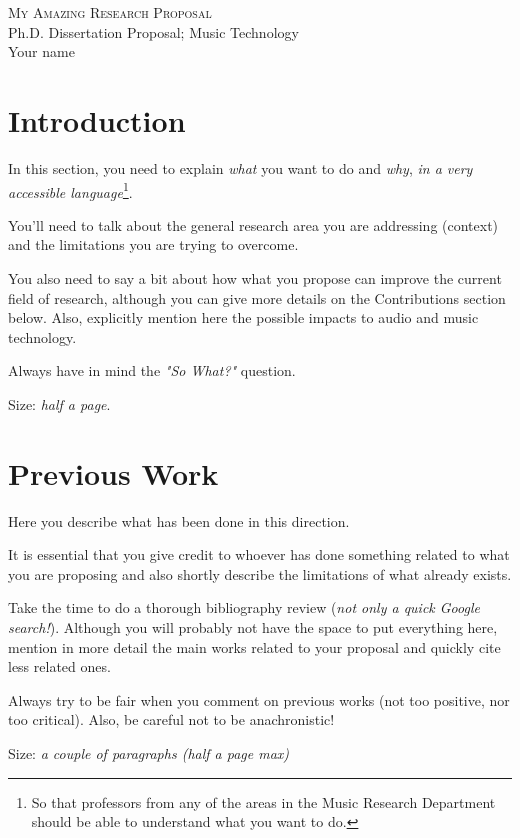 \documentclass[11pt]{article}
\newcommand{\thetitle}{My Amazing Research Proposal}
\begin{document}
\begin{center}
{\scshape\large \thetitle}\\[0.75\baselineskip]
Ph.D. Dissertation Proposal; Music Technology\\
Your name
\end{center}

\thispagestyle{empty}

\section*{Introduction}

In this section, you need to explain \emph{what} you want to do and  \emph{why}, \emph{in a very accessible language}\footnote{So that professors from any of the areas in the Music Research Department should be able to understand what you want to do. }.

You'll need to talk about the general research area you are addressing (context) and the limitations you are trying to overcome.

You also need to say a bit about how what you propose can improve the current field of research, although you can give more details on the Contributions section below. Also, explicitly mention here the possible impacts to audio and music technology.

Always have in mind the \emph{"So What?"} question. 

Size: \emph{half a page}.

\section*{Previous Work}

Here you describe what has been done in this direction. 

It is essential that you give credit to whoever has done something related to what you are proposing and also shortly describe the limitations of what already exists. 

Take the time to do a thorough bibliography review (\emph{not only a quick Google search!}). Although you will probably not have the space to put everything here, mention in more detail the main works related to your proposal and quickly cite less related ones.

Always try to be fair when you comment on previous works (not too positive, nor too critical). Also, be careful not to be anachronistic!

Size: \emph{a couple of paragraphs (half a page max)}
  
\end{document}
